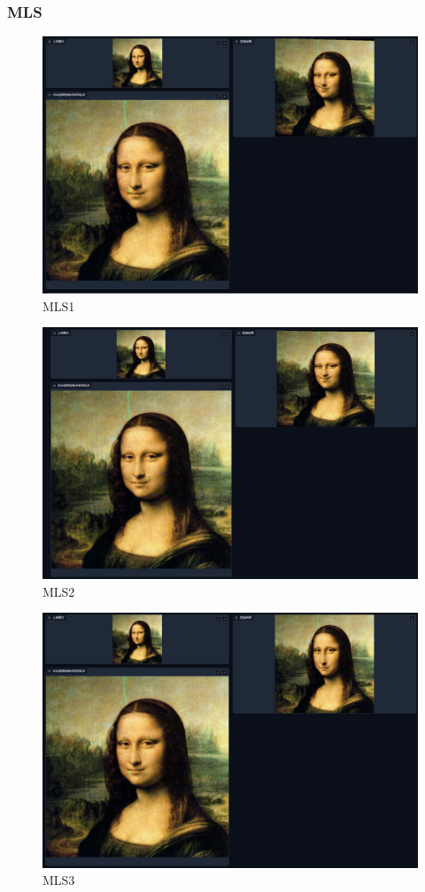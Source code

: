 \documentclass{article}
\begin{document}
	\subsubsection{MLS}
\begin{figure}[H]
	\centering
	\includegraphics[scale=0.4]{result/point/MLS1}
	\caption{MLS1}
	\label{fig:mls1}
\end{figure}
\begin{figure}[H]
	\centering
	\includegraphics[scale=0.4]{result/point/MLS2}
	\caption{MLS2}
	\label{fig:mls2}
\end{figure}
\begin{figure}[H]
	\centering
	\includegraphics[scale=0.4]{result/point/MLS3}
	\caption{MLS3}
	\label{fig:mls3}
\end{figure}
\end{document}
